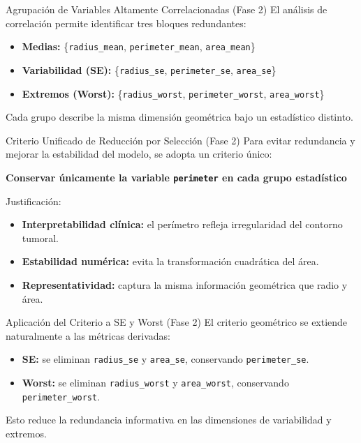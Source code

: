 \documentclass{beamer}
\begin{document}
	\begin{frame}{Agrupación de Variables Altamente Correlacionadas (Fase 2)}
		El análisis de correlación permite identificar tres bloques redundantes:
		
		\begin{itemize}
			\item<2-> \textbf{Medias:} \{\texttt{radius\_mean}, \texttt{perimeter\_mean}, \texttt{area\_mean}\}
			\item<3-> \textbf{Variabilidad (SE):} \{\texttt{radius\_se}, \texttt{perimeter\_se}, \texttt{area\_se}\}
			\item<4-> \textbf{Extremos (Worst):} \{\texttt{radius\_worst}, \texttt{perimeter\_worst}, \texttt{area\_worst}\}
		\end{itemize}
		
		Cada grupo describe la misma dimensión geométrica bajo un estadístico distinto.
	\end{frame}
	
	
	\begin{frame}{Criterio Unificado de Reducción por Selección (Fase 2)}
		Para evitar redundancia y mejorar la estabilidad del modelo, se adopta un criterio único:
		
		\begin{block}{\centering \textbf{Conservar únicamente la variable \texttt{perimeter} en cada grupo estadístico}}
		\end{block}
		
		Justificación:
		
		\begin{itemize}
			\item<2-> \textbf{Interpretabilidad clínica:} el perímetro refleja irregularidad del contorno tumoral.
			\item<3-> \textbf{Estabilidad numérica:} evita la transformación cuadrática del área.
			\item<4-> \textbf{Representatividad:} captura la misma información geométrica que radio y área.
		\end{itemize}
	\end{frame}
	
	
	\begin{frame}{Aplicación del Criterio a SE y Worst (Fase 2)}
		El criterio geométrico se extiende naturalmente a las métricas derivadas:
		
		\begin{itemize}
			\item<2-> \textbf{SE:} se eliminan \texttt{radius\_se} y \texttt{area\_se}, conservando \texttt{perimeter\_se}.
			\item<3-> \textbf{Worst:} se eliminan \texttt{radius\_worst} y \texttt{area\_worst}, conservando \texttt{perimeter\_worst}.
		\end{itemize}
		
		Esto reduce la redundancia informativa en las dimensiones de variabilidad y extremos.
	\end{frame}
	
\end{document}
